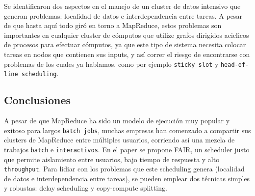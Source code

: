 \documentclass[11pt, a4paper, twoside]{article}
\begin{document}
Se identificaron dos aspectos en el manejo de un cluster de datos
intensivo que generan problemas: localidad de datos e interdependencia
entre tareas. A pesar de que hasta aquí  todo giró en torno a MapReduce, estos
problemas son importantes en cualquier cluster de cómputos que utilize
grafos dirigidos aciclicos de procesos para efectuar cómputos, ya que este
tipo de sistema necesita colocar tareas en nodos que contienen sus inputs, y
así correr el riesgo de encontrarse con problemas de los cuales ya hablamos,
como por ejemplo \texttt{sticky slot}  y \texttt{head-of-line scheduling}.

\clearpage
\subsection {\footnotesize Conclusiones}
\label{investigacion-9}

A pesar de que MapReduce ha sido un modelo de ejecución muy popular y exitoso
para largos \texttt{batch jobs}, muchas empresas han comenzado a compartir
sus clusters de MapReduce entre múltiples usuarios, corriendo así una mezcla
de trabajos \texttt{batch} e \texttt{interactivos}. En el paper se propone
FAIR, un scheduler justo que permite aislamiento entre usuarios, bajo tiempo
de respuesta y alto \texttt{throughput}. Para lidiar con los problemas que este
scheduling genera (localidad de datos e interdependencia entre tareas),
se pueden emplear dos técnicas simples y robustas: delay scheduling y
copy-compute splitting.

\clearpage
\end{document}
